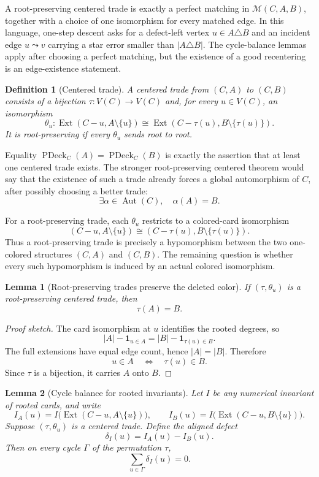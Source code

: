 \documentclass[11pt]{article}
\newtheorem{lemma}{Lemma}
\newtheorem{definition}{Definition}
\newcommand{\PDeck}{\operatorname{PDeck}}
\newcommand{\Ext}{\operatorname{Ext}}
\newcommand{\Aut}{\operatorname{Aut}}
\newcommand{\one}{\mathbf{1}}
\begin{document}
A root-preserving centered trade is exactly a perfect matching in
\(\mathcal M(C,A,B)\), together with a choice of one isomorphism for every
matched edge.  In this language, one-step descent asks for a defect-left
vertex \(u\in A\triangle B\) and an incident edge \(u\leadsto v\) carrying a
star error smaller than \(|A\triangle B|\).  The cycle-balance lemmas apply
after choosing a perfect matching, but the existence of a good recentering is
an edge-existence statement.

\begin{definition}[Centered trade]
A centered trade from \((C,A)\) to \((C,B)\) consists of a bijection
\(\tau:V(C)\to V(C)\) and, for every \(u\in V(C)\), an isomorphism
\[
  \theta_u:
  \Ext(C-u,A\setminus\{u\})
  \cong
  \Ext(C-\tau(u),B\setminus\{\tau(u)\}).
\]
It is root-preserving if every \(\theta_u\) sends root to root.
\end{definition}

Equality \(\PDeck_C(A)=\PDeck_C(B)\) is exactly the assertion that at least one
centered trade exists.  The stronger root-preserving centered theorem would
say that the existence of such a trade already forces a global automorphism of
\(C\), after possibly choosing a better trade:
\[
  \exists \alpha\in\Aut(C),\quad \alpha(A)=B.
\]

For a root-preserving trade, each \(\theta_u\) restricts to a colored-card
isomorphism
\[
  (C-u,A\setminus\{u\})
  \cong
  (C-\tau(u),B\setminus\{\tau(u)\}).
\]
Thus a root-preserving trade is precisely a hypomorphism between the two
one-colored structures \((C,A)\) and \((C,B)\).  The remaining question is
whether every such hypomorphism is induced by an actual colored isomorphism.

\begin{lemma}[Root-preserving trades preserve the deleted color]
If \((\tau,\theta_u)\) is a root-preserving centered trade, then
\[
  \tau(A)=B.
\]
\end{lemma}

\begin{proof}[Proof sketch]
The card isomorphism at \(u\) identifies the rooted degrees, so
\[
  |A|-\one_{u\in A}
  =
  |B|-\one_{\tau(u)\in B}.
\]
The full extensions have equal edge count, hence \(|A|=|B|\).  Therefore
\[
  u\in A
  \quad\Longleftrightarrow\quad
  \tau(u)\in B.
\]
Since \(\tau\) is a bijection, it carries \(A\) onto \(B\).
\end{proof}

\begin{lemma}[Cycle balance for rooted invariants]
Let \(I\) be any numerical invariant of rooted cards, and write
\[
  I_A(u)=I\bigl(\Ext(C-u,A\setminus\{u\})\bigr),
  \qquad
  I_B(u)=I\bigl(\Ext(C-u,B\setminus\{u\})\bigr).
\]
Suppose \((\tau,\theta_u)\) is a centered trade.  Define the aligned defect
\[
  \delta_I(u)=I_A(u)-I_B(u).
\]
Then on every cycle \(\Gamma\) of the permutation \(\tau\),
\[
  \sum_{u\in\Gamma}\delta_I(u)=0.
\]
\end{lemma}
\end{document}
